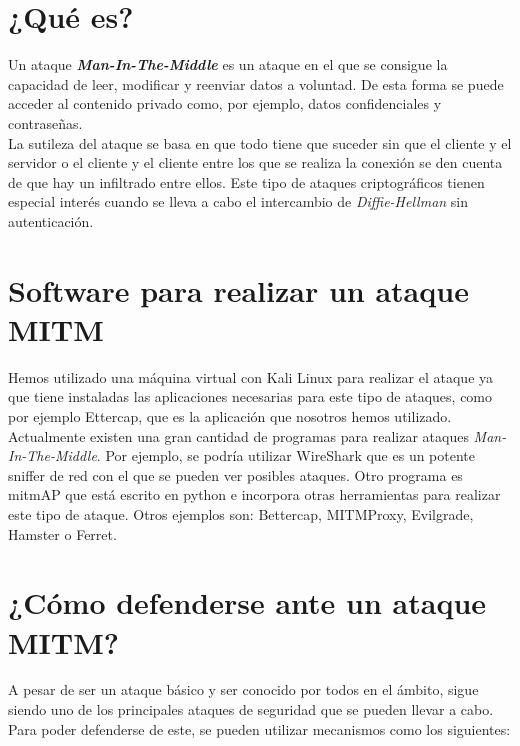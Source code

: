\documentclass[11pt,a4paper]{article}
\begin{document}
\tableofcontents
\thispagestyle{empty}

\newpage

\section{¿Qué es?}

Un ataque \textbf{\textit{Man-In-The-Middle}} es un ataque en el que se consigue la capacidad de leer, modificar y reenviar datos a voluntad. De esta forma se puede acceder al contenido privado como, por ejemplo, datos confidenciales y contraseñas.\\

La sutileza del ataque se basa en que todo tiene que suceder sin que el cliente y el servidor o el cliente y el cliente entre los que se realiza la conexión se den cuenta de que hay un infiltrado entre ellos. Este tipo de ataques criptográficos tienen especial interés cuando se lleva a cabo el intercambio de \textit{Diffie-Hellman} sin autenticación.

\section{Software para realizar un ataque MITM}

Hemos utilizado una máquina virtual con Kali Linux para realizar el ataque ya que tiene instaladas las aplicaciones necesarias para este tipo de ataques, como por ejemplo Ettercap, que es la aplicación que nosotros hemos utilizado.\\

Actualmente existen una gran cantidad de programas para realizar ataques \textit{Man-In-The-Middle}. Por ejemplo, se podría utilizar WireShark que es un potente sniffer de red con el que se pueden ver posibles ataques. Otro programa es mitmAP que está escrito en python e incorpora otras herramientas para realizar este tipo de ataque. Otros ejemplos son: Bettercap, MITMProxy, Evilgrade, Hamster o Ferret.

\section{¿Cómo defenderse ante un ataque MITM?}

A pesar de ser un ataque básico y ser conocido por todos en el ámbito, sigue siendo uno de los principales ataques de seguridad que se pueden llevar a cabo. Para poder defenderse de este, se pueden utilizar mecanismos como los siguientes:
\end{document}
